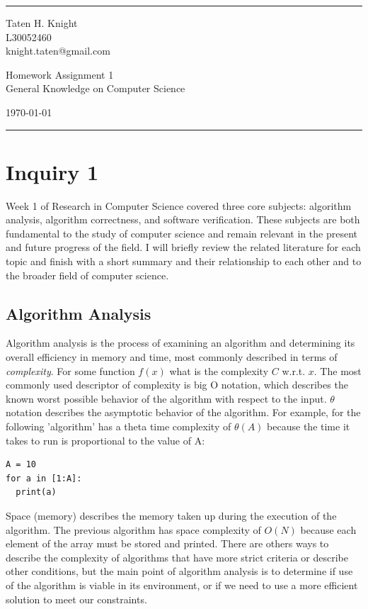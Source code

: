 \documentclass[a4paper]{article}
\begin{document}

\fancyhead[C]{}
\hrule \medskip %
\begin{minipage}{0.295\textwidth} 
\raggedright
\footnotesize
Taten H. Knight \hfill\\   
L30052460\hfill\\
knight.taten@gmail.com
\end{minipage}
\begin{minipage}{0.4\textwidth} 
\centering 
\large 
Homework Assignment 1\\ 
\normalsize 
General Knowledge on Computer Science\\ 
\end{minipage}
\begin{minipage}{0.295\textwidth} 
\raggedleft
\today\hfill\\
\end{minipage}
\medskip\hrule 
\bigskip


\section{Inquiry 1}
Week 1 of Research in Computer Science covered three core subjects: algorithm analysis, algorithm correctness, and software verification. These subjects are both fundamental to the study of computer science and remain relevant in the present and future progress of the field. I will briefly review the related literature for each topic and finish with a short summary and their relationship to each other and to the broader field of computer science.

\subsection{Algorithm Analysis}
Algorithm analysis is the process of examining an algorithm and determining its overall efficiency in memory and time, most commonly described in terms of \emph{complexity}. For some function $f(x)$ what is the complexity $C$ w.r.t. $x$. The most commonly used descriptor of complexity is big O notation, which describes the known worst possible behavior of the algorithm with respect to the input. $\theta$ notation describes the asymptotic behavior of the algorithm. For example, for the following 'algorithm' has a theta time complexity of $\theta(A)$ because the time it takes to run is proportional to the value of A:
\begin{lstlisting}
A = 10
for a in [1:A]:
  print(a)
\end{lstlisting}
Space (memory) describes the memory taken up during the execution of the algorithm. The previous algorithm has space complexity of $O(N)$ because each element of the array must be stored and printed. There are others ways to describe the complexity of algorithms that have more strict criteria or describe other conditions, but the main point of algorithm analysis is to determine if use of the algorithm is viable in its environment, or if we need to use a more efficient solution to meet our constraints.
\end{document}
